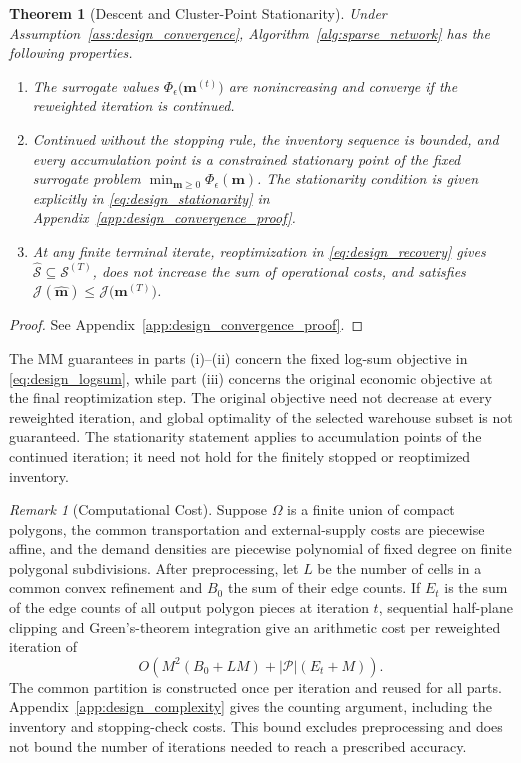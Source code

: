 \documentclass[a4paper,fleqn]{cas-sc}
\newtheorem{theorem}{Theorem}
\theoremstyle{remark}
\newtheorem*{remark}{Remark}
\theoremstyle{plain}
\begin{document}
\begin{theorem}[Descent and Cluster-Point Stationarity]
\label{thm:design_convergence}
Under Assumption~\ref{ass:design_convergence}, Algorithm~\ref{alg:sparse_network} has the following properties.
\begin{enumerate}
    \item[\rm(i)] The surrogate values $\Phi_\epsilon\bigl(\mathbf m^{(t)}\bigr)$ are nonincreasing and converge if the reweighted iteration is continued.
    \item[\rm(ii)] Continued without the stopping rule, the inventory sequence is bounded, and every accumulation point is a constrained stationary point of the fixed surrogate problem $\min_{\mathbf m\ge0}\Phi_\epsilon(\mathbf m)$. The stationarity condition is given explicitly in \eqref{eq:design_stationarity} in Appendix~\ref{app:design_convergence_proof}.
    \item[\rm(iii)] At any finite terminal iterate, reoptimization in \eqref{eq:design_recovery} gives $\widehat{\mathcal S}\subseteq\mathcal S^{(T)}$, does not increase the sum of operational costs, and satisfies $\mathcal J(\hat{\mathbf m})\le\mathcal J\bigl(\mathbf m^{(T)}\bigr)$.
\end{enumerate}
\end{theorem}
\begin{proof}
See Appendix~\ref{app:design_convergence_proof}.
\end{proof}

The MM guarantees in parts (i)--(ii) concern the fixed log-sum objective in \eqref{eq:design_logsum}, while part (iii) concerns the original economic objective at the final reoptimization step. The original objective need not decrease at every reweighted iteration, and global optimality of the selected warehouse subset is not guaranteed. The stationarity statement applies to accumulation points of the continued iteration; it need not hold for the finitely stopped or reoptimized inventory.

\begin{remark}[Computational Cost]
Suppose $\Omega$ is a finite union of compact polygons, the common transportation and external-supply costs are piecewise affine, and the demand densities are piecewise polynomial of fixed degree on finite polygonal subdivisions. After preprocessing, let $L$ be the number of cells in a common convex refinement and $B_0$ the sum of their edge counts. If $E_t$ is the sum of the edge counts of all output polygon pieces at iteration $t$, sequential half-plane clipping and Green's-theorem integration give an arithmetic cost per reweighted iteration of
\begin{equation}\label{eq:design_iteration_complexity}
    O\!\left(M^2(B_0+LM)+|\mathcal P|(E_t+M)\right).
\end{equation}
The common partition is constructed once per iteration and reused for all parts. Appendix~\ref{app:design_complexity} gives the counting argument, including the inventory and stopping-check costs. This bound excludes preprocessing and does not bound the number of iterations needed to reach a prescribed accuracy.
\end{remark}
\end{document}
